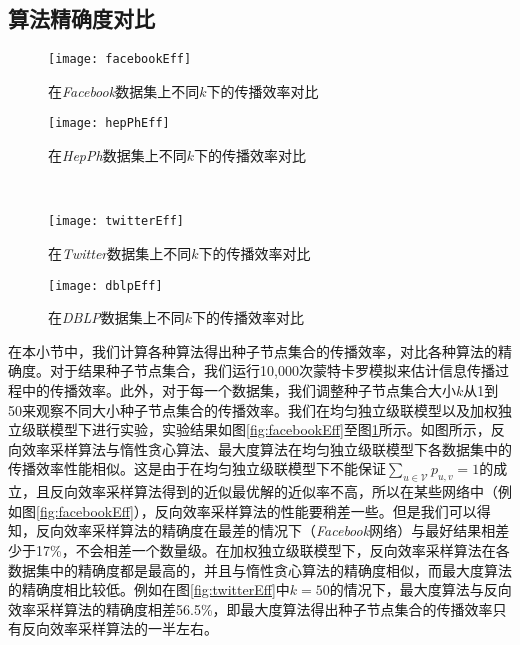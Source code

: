 \subsection{算法精确度对比}
\label{subsec4:accuracy}
\begin{figure}[!ht]
   \begin{minipage}{0.48\textwidth}
     \centering
     \texttt{[image: facebookEff]}
     \caption{在\textit{Facebook}数据集上不同$k$下的传播效率对比}
     \label{fig:facebookEff}
   \end{minipage}
   \hfill
   \begin {minipage}{0.48\textwidth}
     \centering
     \texttt{[image: hepPhEff]}
     \caption{在\textit{HepPh}数据集上不同$k$下的传播效率对比}
     \label{fig:hepPhEff}
   \end{minipage}
   \\
   \begin{minipage}{0.48\textwidth}
     \centering
     \texttt{[image: twitterEff]}
     \caption{在\textit{Twitter}数据集上不同$k$下的传播效率对比}
     \label{fig:twitterEff}
   \end{minipage}
   \hfill
   \begin {minipage}{0.48\textwidth}
     \centering
     \texttt{[image: dblpEff]}
     \caption{在\textit{DBLP}数据集上不同$k$下的传播效率对比}
     \label{fig:dblpEff}
   \end{minipage}
\end{figure}

在本小节中，我们计算各种算法得出种子节点集合的传播效率，对比各种算法的精确度。对于结果种子节点集合，我们运行10,000次蒙特卡罗模拟来估计信息传播过程中的传播效率。此外，对于每一个数据集，我们调整种子节点集合大小$k$从1到50来观察不同大小种子节点集合的传播效率。我们在均匀独立级联模型以及加权独立级联模型下进行实验，实验结果如图\ref{fig:facebookEff}至图\ref{fig:dblpEff}所示。如图所示，反向效率采样算法与惰性贪心算法、最大度算法在均匀独立级联模型下各数据集中的传播效率性能相似。这是由于在均匀独立级联模型下不能保证$\sum_{u \in \mathcal{V}}{p_{u,v}} = 1$的成立，且反向效率采样算法得到的近似最优解的近似率不高，所以在某些网络中（例如图\ref{fig:facebookEff}），反向效率采样算法的性能要稍差一些。但是我们可以得知，反向效率采样算法的精确度在最差的情况下（\textit{Facebook}网络）与最好结果相差少于17\%，不会相差一个数量级。在加权独立级联模型下，反向效率采样算法在各数据集中的精确度都是最高的，并且与惰性贪心算法的精确度相似，而最大度算法的精确度相比较低。例如在图\ref{fig:twitterEff}中$k=50$的情况下，最大度算法与反向效率采样算法的精确度相差56.5\%，即最大度算法得出种子节点集合的传播效率只有反向效率采样算法的一半左右。

